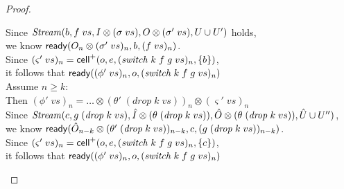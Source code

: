 \begin{proof}
\begin{enumerate}
\begin{tabbedproof}
  \oooo Since $\mathit{Stream}(b, f\;vs, I \otimes (\sigma\;vs), O \otimes (\sigma'\;vs), U \cup U')$ holds, \\
  \oooo we know $\mathsf{ready}({O_n \otimes (\sigma'\;vs)_n}, {b}, {(f\;vs)_n})$. \\
  \oooo Since $(\varsigma'\;vs)_n = \mathsf{cell}^{+}({o}, {e}, {(\mathit{switch}\;k\;f\;g\;vs)_n}, {\{{b}\}})$, \\
  \oooo it follows that $\mathsf{ready}({(\phi'\;vs)_n}, {o}, {(\mathit{switch}\;k\;f\;g\;vs)_n})$ \\
  \ooo Assume $n \geq k$: \\
  \oooo Then $(\phi'\;vs)_n = \ldots \otimes (\theta'\;(\mathit{drop}\;k\;vs))_n \otimes (\varsigma'\;vs)_n$ \\
  \oooo Since $\mathit{Stream}(c, g\;(\mathit{drop}\;k\;vs), \hat{I} \otimes (\theta\;(\mathit{drop}\;k\;vs)), \hat{O} \otimes (\theta\;(\mathit{drop}\;k\;vs)), \hat{U} \cup U'')$, \\ 
  \oooo we know $\mathsf{ready}({\hat{O}_{n-k} \otimes (\theta'\;(\mathit{drop}\;k\;vs))_{n-k}}, {c}, {(g\;(\mathit{drop}\;k\;vs))_{n-k}})$. \\
  \oooo Since $(\varsigma'\;vs)_n = \mathsf{cell}^{+}({o}, {e}, {(\mathit{switch}\;k\;f\;g\;vs)_n}, {\{{c}\}})$, \\
  \oooo it follows that $\mathsf{ready}({(\phi'\;vs)_n}, {o}, {(\mathit{switch}\;k\;f\;g\;vs)_n})$ \\


\end{tabbedproof}
\end{enumerate}
\end{proof}
